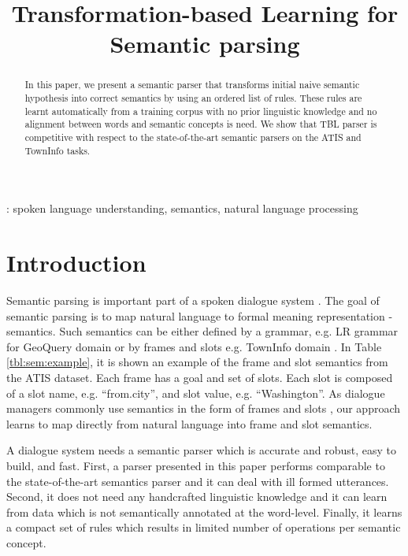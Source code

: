 \documentclass{article}
\title{Transformation-based Learning for Semantic parsing}
\begin{document}
\maketitle
%
\begin{abstract}
In this paper, we present a semantic parser that transforms initial naive semantic hypothesis into correct semantics by using an ordered list of rules. These rules are learnt automatically from a training corpus with no prior linguistic knowledge and no alignment between words and semantic concepts is need. We show that TBL parser is competitive with respect to the state-of-the-art semantic parsers on the ATIS and TownInfo tasks.
\end{abstract}
\vspace{0.1cm}
: spoken language understanding, semantics, natural language processing


\section{Introduction}
Semantic parsing is important part of a spoken dialogue system \cite{williams07}. The goal of semantic parsing is to map natural language to formal meaning representation - semantics. Such semantics can be either defined by a grammar, e.g. LR grammar for GeoQuery domain \cite{kate05} or by frames and slots e.g. TownInfo domain \cite{thomson08}. In Table \ref{tbl:sem:example}, it is shown an example of the frame and slot semantics from the ATIS dataset. Each frame has a goal and set of slots. Each slot is composed of a slot name, e.g. ``from.city'',
and slot value, e.g. ``Washington''. As dialogue managers commonly use semantics in the form of frames and slots \cite{williams07,thomson08}, our approach learns to map directly from natural language into frame and slot semantics.



A dialogue system needs a semantic parser which is accurate and robust, easy to build, and fast. First, a parser presented in this paper performs comparable to the state-of-the-art semantics parser and it can deal with ill formed utterances. Second, it does not need any handcrafted linguistic knowledge and it can learn from data which is not semantically annotated at the word-level. Finally, it learns a compact set of rules which results in limited number of operations per semantic concept.
\end{document}
